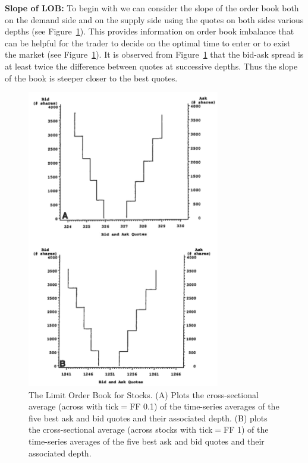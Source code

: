 \noindent \textbf{Slope of LOB:} To begin with we can consider the slope of the order book both on the demand side and on the supply side using the quotes on both sides various depths (see Figure~\ref{fig:limitstocks}). This provides information on order book imbalance that can be helpful for the trader to decide on the optimal time to enter or to exist the market (see Figure~\ref{fig:limitstocks}). It is observed from Figure~\ref{fig:limitstocks} that the bid-ask spread is at least twice the difference between quotes at successive depths. Thus the slope of the book is steeper closer to the best quotes. \\
	\begin{figure}[!ht]
	   \centering
	   \includegraphics[width=0.75\textwidth]{chapters/chapter_el_exch/figures/limitstocks.png} 
	\caption{The Limit Order Book for Stocks. (A) Plots the cross-sectional average (across with tick$=$FF 0.1) of the time-series averages of the five best ask and bid quotes and their associated depth. (B) plots the cross-sectional average (across stocks with tick$=$FF 1) of the time-series averages of the five best ask and bid quotes and their associated depth.\label{fig:limitstocks}}
	\end{figure}

